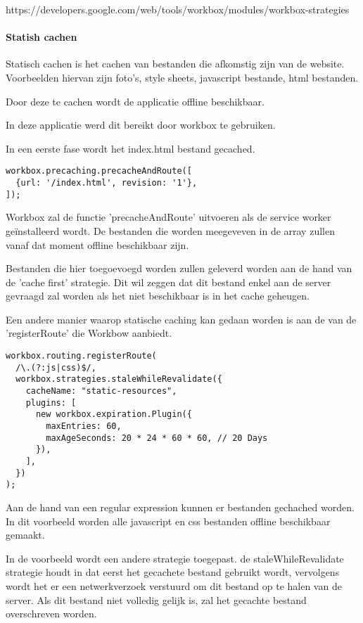 	https://developers.google.com/web/tools/workbox/modules/workbox-strategies
	
		\paragraph{Statish cachen}
			Statisch cachen is het cachen van bestanden die afkomstig zijn van de website. Voorbeelden hiervan zijn foto's, style sheets, javascript bestande, html bestanden.
			
			Door deze te cachen wordt de applicatie offline beschikbaar.
			
			In deze applicatie werd dit bereikt door workbox te gebruiken.
			
			In een eerste fase wordt het index.html bestand gecached.
\begin{lstlisting}
workbox.precaching.precacheAndRoute([
  {url: '/index.html', revision: '1'},
]);
\end{lstlisting}
		
			Workbox zal de functie 'precacheAndRoute' uitvoeren als de service worker geïnstalleerd wordt. De bestanden die worden meegeveven in de array zullen vanaf dat moment offline beschikbaar zijn.
			
			Bestanden die hier toegoevoegd worden zullen geleverd worden aan de hand van de 'cache first' strategie. Dit wil zeggen dat dit bestand enkel aan de server gevraagd zal worden als het niet beschikbaar is in het cache geheugen.
			
			Een andere manier waarop statische caching kan gedaan worden is aan de van de 'registerRoute' die Workbow aanbiedt. 
			
\begin{lstlisting}
workbox.routing.registerRoute(
  /\.(?:js|css)$/,
  workbox.strategies.staleWhileRevalidate({
    cacheName: "static-resources",
    plugins: [
      new workbox.expiration.Plugin({
        maxEntries: 60,
        maxAgeSeconds: 20 * 24 * 60 * 60, // 20 Days
      }),
    ],
  })
);
\end{lstlisting}
			
			Aan de hand van een regular expression kunnen er bestanden gechached worden. In dit voorbeeld worden alle javascript en css bestanden offline beschikbaar gemaakt.
			
			In de voorbeeld wordt een andere strategie toegepast. de staleWhileRevalidate strategie houdt in dat eerst het gecachete bestand gebruikt wordt, vervolgens wordt het er een netwerkverzoek verstuurd om dit bestand op te halen van de server. Als dit bestand niet volledig gelijk is, zal het gecachte bestand overschreven worden.
			
